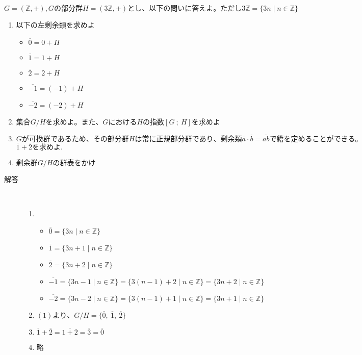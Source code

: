 \documentclass[dvipdfmx]{jsarticle}
\begin{document}
\begin{tcolorbox}[colframe=black!50,colback=white,colbacktitle=black!50,coltitle=white,fonttitle=\bfseries\sffamily,title=問題4]
$G = (\mathbb{Z}, +), Gの部分群 H = (3\mathbb{Z}, +)とし、以下の問いに答えよ。ただし 3\mathbb{Z} = \{ 3n \mid n \in \mathbb{Z} \}$
\begin{enumerate}
  \item 以下の左剰余類を求めよ
  \begin{itemize}
    \item $\overline{0} = 0 + H$
    \item $\overline{1} = 1+ H$
    \item $\overline{2} = 2 + H$
    \item $\overline{-1} = (-1) + H$
    \item $\overline{-2} = (-2) + H$
  \end{itemize}
  \item $集合G/Hを求めよ。また、GにおけるHの指数[G \ ; \ H]を求めよ$
  \item $Gが可換群であるため、その部分群Hは常に正規部分群であり、剰余類\overline{a} \cdot \overline{b} = \overline{ab}で籍を定めることができる。$\\
  $\overline{1} + \overline{2}を求めよ.$
  \item $剰余群G/Hの群表をかけ$
\end{enumerate}
\end{tcolorbox}
\begin{description}
  \item[解答] \mbox{} \\
  \begin{enumerate}
    \item
    \begin{itemize}
      \item $\overline{0} = \{ 3n \mid n \in \mathbb{Z} \}$
      \item $\overline{1} = \{ 3n+1 \mid n \in \mathbb{Z} \}$
      \item $\overline{2} = \{ 3n+2 \mid n \in \mathbb{Z} \}$
      \item $\overline{-1} = \{ 3n-1 \mid n \in \mathbb{Z} \} = \{ 3(n-1) + 2 \mid n \in \mathbb{Z} \} = \{ 3n + 2 \mid n \in \mathbb{Z} \}$
      \item $\overline{-2} = \{ 3n-2 \mid n \in \mathbb{Z} \} = \{ 3(n-1) + 1 \mid n \in \mathbb{Z} \} = \{ 3n + 1 \mid n \in \mathbb{Z} \}$
    \end{itemize}

    \item $(1)より、G/H = \{ \overline{0}, \ \overline{1} ,\ \overline{2} \}$

    \item $\overline{1} + \overline{2} = \overline{1+2} = \overline{3} = \overline{0}$

    \item 略

  \end{enumerate}
\end{description}
\end{document}

